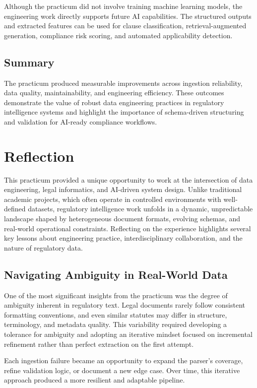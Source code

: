 \documentclass[sigconf]{acmart}
\begin{document}
Although the practicum did not involve training machine learning models, the engineering work directly supports future AI capabilities. The structured outputs and extracted features can be used for clause classification, retrieval-augmented generation, compliance risk scoring, and automated applicability detection.

\subsection{Summary}

The practicum produced measurable improvements across ingestion reliability, data quality, maintainability, and engineering efficiency. These outcomes demonstrate the value of robust data engineering practices in regulatory intelligence systems and highlight the importance of schema-driven structuring and validation for AI-ready compliance workflows.

\section{Reflection}

This practicum provided a unique opportunity to work at the intersection of data engineering, legal informatics, and AI-driven system design. Unlike traditional academic projects, which often operate in controlled environments with well-defined datasets, regulatory intelligence work unfolds in a dynamic, unpredictable landscape shaped by heterogeneous document formats, evolving schemas, and real-world operational constraints. Reflecting on the experience highlights several key lessons about engineering practice, interdisciplinary collaboration, and the nature of regulatory data.

\subsection{Navigating Ambiguity in Real-World Data}

One of the most significant insights from the practicum was the degree of ambiguity inherent in regulatory text. Legal documents rarely follow consistent formatting conventions, and even similar statutes may differ in structure, terminology, and metadata quality. This variability required developing a tolerance for ambiguity and adopting an iterative mindset focused on incremental refinement rather than perfect extraction on the first attempt.

Each ingestion failure became an opportunity to expand the parser’s coverage, refine validation logic, or document a new edge case. Over time, this iterative approach produced a more resilient and adaptable pipeline.
\end{document}
